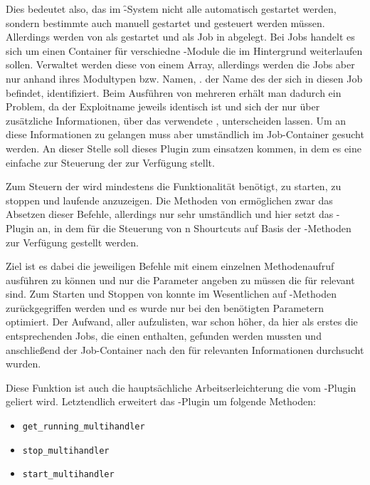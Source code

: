 Dies bedeutet also, das im \f-System nicht alle 
automatisch gestartet werden, sondern bestimmte auch manuell gestartet und
gesteuert werden müssen. Allerdings werden  von
 als  gestartet und als Job in  abgelegt. Bei Jobs
handelt es sich um einen Container für verschiedne -Module die im
Hintergrund weiterlaufen sollen. Verwaltet werden diese von einem Array,
allerdings werden die Jobs aber nur anhand ihres Modultypen bzw. Namen, \zB.
der Name des  der sich in diesen Job befindet, identifiziert. Beim
Ausführen von mehreren  erhält man dadurch ein Problem, da
der Exploitname jeweils identisch ist und sich der  nur über
zusätzliche Informationen, \zB über das verwendete ,
unterscheiden lassen. Um an diese Informationen zu gelangen muss aber
umständlich im Job-Container gesucht werden. An dieser Stelle soll dieses
Plugin zum einsatzen kommen, in dem es eine einfache  zur Steuerung
der  zur Verfügung stellt.

Zum Steuern der  wird mindestens die Funktionalität benötigt,
 zu starten, zu stoppen und laufende 
anzuzeigen. Die Methoden von  ermöglichen zwar das Absetzen dieser
Befehle, allerdings nur sehr umständlich und hier setzt das
-Plugin an, in dem für die Steuerung von
n Shourtcuts auf Basis der -Methoden zur Verfügung
gestellt werden.

Ziel ist es dabei die jeweiligen Befehle mit einem einzelnen Methodenaufruf
ausführen zu können und nur die Parameter angeben zu müssen die für
 relevant sind. Zum Starten und Stoppen von
 konnte im Wesentlichen auf -Methoden
zurückgegriffen werden und es wurde nur bei den benötigten Parametern
optimiert. Der Aufwand, aller  aufzulisten, war schon
höher, da hier als erstes die entsprechenden Jobs, die einen
 enthalten, gefunden werden mussten und anschließend der
Job-Container nach den für  relevanten Informationen
durchsucht wurden.

Diese Funktion ist auch die hauptsächliche Arbeitserleichterung die vom
-Plugin geliert wird. Letztendlich erweitert das
-Plugin  um folgende Methoden:

\begin{itemize}
  \item \texttt{get\_running\_multihandler}
  \item \texttt{stop\_multihandler}
  \item \texttt{start\_multihandler}
\end{itemize}

